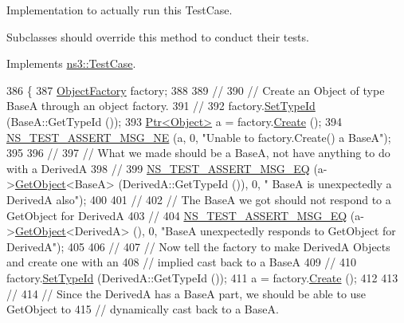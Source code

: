 Implementation to actually run this Test\+Case. 

Subclasses should override this method to conduct their tests. 

Implements \hyperlink{classns3_1_1TestCase_a8ff74680cf017ed42011e4be51917a24}{ns3\+::\+Test\+Case}.


\begin{DoxyCode}
386 \{
387   \hyperlink{classns3_1_1ObjectFactory}{ObjectFactory} factory;
388 
389   \textcolor{comment}{//}
390   \textcolor{comment}{// Create an Object of type BaseA through an object factory.}
391   \textcolor{comment}{//}
392   factory.\hyperlink{classns3_1_1ObjectFactory_a77dcd099064038a1eb7a6b8251229ec3}{SetTypeId} (BaseA::GetTypeId ());
393   \hyperlink{classns3_1_1Ptr}{Ptr<Object>} a = factory.\hyperlink{classns3_1_1ObjectFactory_a18152e93f0a6fe184ed7300cb31e9896}{Create} ();
394   \hyperlink{group__testing_ga73d66fb0050a5111453fd144e767b91a}{NS\_TEST\_ASSERT\_MSG\_NE} (a, 0, \textcolor{stringliteral}{"Unable to factory.Create() a BaseA"});
395 
396   \textcolor{comment}{//}
397   \textcolor{comment}{// What we made should be a BaseA, not have anything to do with a DerivedA}
398   \textcolor{comment}{//}
399   \hyperlink{group__testing_ga2a9d78cffb3db8e867c35fff0b698cf5}{NS\_TEST\_ASSERT\_MSG\_EQ} (a->\hyperlink{classns3_1_1Object_a13e18c00017096c8381eb651d5bd0783}{GetObject}<BaseA> (DerivedA::GetTypeId ()), 0, \textcolor{stringliteral}{"
      BaseA is unexpectedly a DerivedA also"});
400 
401   \textcolor{comment}{//}
402   \textcolor{comment}{// The BaseA we got should not respond to a GetObject for DerivedA}
403   \textcolor{comment}{//}
404   \hyperlink{group__testing_ga2a9d78cffb3db8e867c35fff0b698cf5}{NS\_TEST\_ASSERT\_MSG\_EQ} (a->\hyperlink{classns3_1_1Object_a13e18c00017096c8381eb651d5bd0783}{GetObject}<DerivedA> (), 0, \textcolor{stringliteral}{"BaseA unexpectedly
       responds to GetObject for DerivedA"});
405 
406   \textcolor{comment}{//}
407   \textcolor{comment}{// Now tell the factory to make DerivedA Objects and create one with an }
408   \textcolor{comment}{// implied cast back to a BaseA}
409   \textcolor{comment}{//}
410   factory.\hyperlink{classns3_1_1ObjectFactory_a77dcd099064038a1eb7a6b8251229ec3}{SetTypeId} (DerivedA::GetTypeId ());
411   a = factory.\hyperlink{classns3_1_1ObjectFactory_a18152e93f0a6fe184ed7300cb31e9896}{Create} ();
412 
413   \textcolor{comment}{//}
414   \textcolor{comment}{// Since the DerivedA has a BaseA part, we should be able to use GetObject to }
415   \textcolor{comment}{// dynamically cast back to a BaseA.}

\end{DoxyCode}
